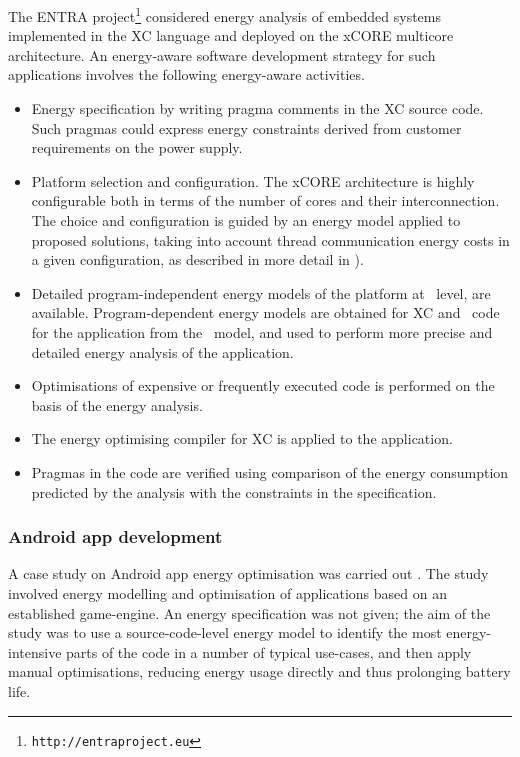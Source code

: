 \documentclass[oneside]{book}
\begin{document}
The ENTRA project\footnote{\texttt{http://entraproject.eu}} considered energy analysis of embedded systems implemented in the XC language and deployed on the xCORE multicore architecture.  An energy-aware software development strategy for such applications involves the following energy-aware activities.
\begin{itemize}
\item
Energy specification by writing pragma comments in the XC source code.  Such pragmas could express energy constraints derived from customer requirements on the power supply.
\item
Platform selection and configuration.  The xCORE architecture is highly configurable both in terms of the number of cores and their interconnection.  The choice and configuration is guided by an energy model applied to proposed solutions, taking into account thread communication energy costs in a given configuration, as described in more detail in \cite{KerrisonSwallow15}).
\item
Detailed program-independent energy models of the platform at \isa\ level, are available.  
Program-dependent energy models are obtained for XC and \llvmir\ code for the application from the \isa\ model, and used to perform more precise and detailed energy analysis of the application.
\item
Optimisations of expensive or frequently executed code is performed on the basis of the energy analysis.
\item
The energy optimising compiler for XC is applied to the application.
\item
Pragmas in the code are verified using comparison of the energy consumption predicted by the analysis with the constraints in the specification.  

\end{itemize}


\subsubsection{Android app development}\label{android-scenario}

A case study on Android app energy optimisation was carried out \cite{LiGallagher-TSE-2016}.  The study involved  energy modelling and optimisation of applications based on an established game-engine.  An energy specification was not given; the aim of the study was to use a source-code-level energy model to identify the most energy-intensive parts of the code in a number of typical use-cases, and then apply manual optimisations, reducing energy usage directly and thus prolonging battery life.
\end{document}
